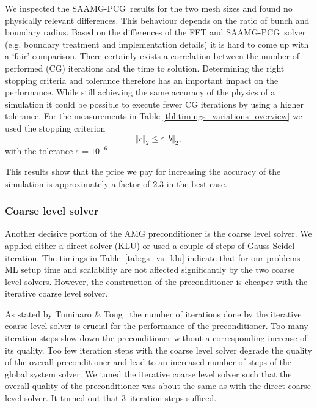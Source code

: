 \documentclass[a4paper,10pt,3p,preprint,pdftex]{elsarticle}
\newcommand{\oursolver}{\textsc{SAAMG-PCG}}
\begin{document}

We inspected the \oursolver\ results for the two mesh sizes and found no
physically relevant differences. This behaviour depends on the ratio of
bunch and boundary radius.  Based on the differences of the FFT and
\oursolver\ solver (e.g. boundary treatment and implementation details)
it is hard to come up with a `fair' comparison.  There certainly exists
a correlation between the number of performed (CG) iterations and the
time to solution.  Determining the right stopping criteria and tolerance
therefore has an important impact on the performance.  While still
achieving the same accuracy of the physics of a simulation it could be
possible to execute fewer CG iterations by using a higher tolerance.
For the measurements in Table \ref{tbl:timings_variations_overview} we
used the stopping criterion
\begin{equation*}
  \Vert r \Vert_2 \le \varepsilon  {\Vert b \Vert_2},
\end{equation*}
with the tolerance $\varepsilon = 10^{-6}$.

This results show that the price we pay for increasing the accuracy of the
simulation is approximately a factor of 2.3 in the best case.

\subsubsection*{Coarse level solver}

Another decisive portion of the AMG preconditioner is the coarse level
solver.  We applied either a direct solver (KLU) or used a couple of
steps of Gauss-Seidel iteration.  The timings in
Table~\ref{tab:gs_vs_klu} indicate that for our problems ML setup time
and scalability are not affected significantly by the two coarse level
solvers.  However, the construction of the preconditioner is cheaper
with the iterative coarse level solver.  

As stated by Tuminaro \& Tong~\cite{tuto:00} the number of iterations
done by the iterative coarse level solver is crucial for the performance of the
preconditioner.  Too many iteration steps slow down the preconditioner without a
corresponding increase of its quality.  Too
few iteration steps with the coarse level solver degrade the quality of
the overall preconditioner and lead to an increased number of steps of
the global system solver.  We tuned the iterative coarse level solver
such that the overall quality of the preconditioner was about the same
as with the direct coarse level solver.  It turned out that 3~iteration
steps sufficed.
\end{document}
